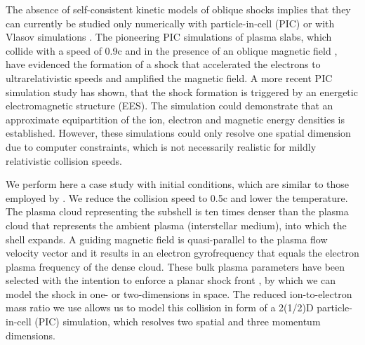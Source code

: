 \documentclass[structabstract]{aa}
\begin{document}
The absence of self-consistent kinetic models of oblique shocks implies 
that they can currently be studied only numerically with particle-in-cell 
(PIC) \citep{Code2,Code1} or with Vlasov simulations \citep{Arber,Sircombe}. 
The pioneering PIC simulations of plasma slabs, which collide with a speed 
of 0.9c and in the presence of an oblique magnetic field 
\citep{Oblique1,Oblique2}, have evidenced the formation of a shock that 
accelerated the electrons to ultrarelativistic speeds and amplified the 
magnetic field. A more recent PIC simulation study \citep{Shock1} has shown, 
that the shock formation is triggered by an energetic electromagnetic 
structure (EES). The simulation could demonstrate that an approximate 
equipartition of the ion, electron and magnetic energy densities is 
established. However, these simulations could only resolve one spatial 
dimension due to computer constraints, which is not necessarily realistic 
for mildly relativistic collision speeds.

We perform here a case study with initial conditions, which are similar
to those employed by \citet{Shock1}. We reduce the collision speed to 0.5c 
and lower the temperature. The plasma cloud representing the subshell is 
ten times denser than the plasma cloud that represents the ambient plasma 
(interstellar medium), into which the shell expands. A guiding magnetic 
field is quasi-parallel to the plasma flow velocity vector and it results 
in an electron gyrofrequency that equals the electron plasma frequency of 
the dense cloud. These bulk plasma parameters have been selected with the 
intention to enforce a planar shock front \citep{Nish,Mag,Shock1}, by which 
we can model the shock in one- or two-dimensions in space. The reduced 
ion-to-electron mass ratio we use allows us to model this collision in 
form of a 2(1/2)D particle-in-cell (PIC) simulation, which resolves two 
spatial and three momentum dimensions.
\end{document}
